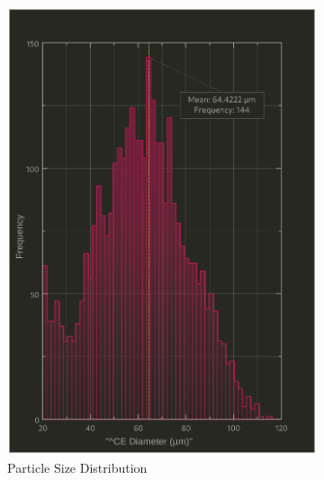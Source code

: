 \documentclass{article}
\begin{document}
    \begin{figure}[h!]
        \centering
        \begin{subfigure}[a]{0.5\textwidth}
            \centering
            \includegraphics[width=\textwidth]{Pictures/Granulometry_plots/Histogram_CE-DIAM.eps}
            \caption{Particle Size Distribution}
            \label{fig:particle_size_distribution}
        \end{subfigure}
        \vfill 
        \begin{subfigure}[b]{0.5\textwidth}
            \centering

\end{subfigure}
\end{figure}
\end{document}

